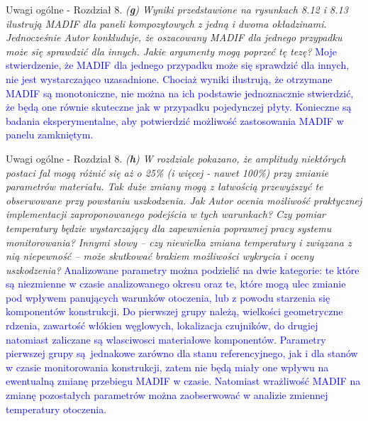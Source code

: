 \documentclass[10pt,aspectratio=169]{beamer} %
\begin{document}
\begin{frame}[label=frame38]{Uwagi ogólne - Rozdział 8.}\justifying
\textit{(\textbf{g}) Wyniki przedstawione na rysunkach 8.12 i 8.13 ilustrują MADIF dla paneli kompozytowych z jedną i dwoma okładzinami. Jednocześnie Autor konkluduje, że oszacowany MADIF dla jednego przypadku może się sprawdzić dla innych. Jakie	argumenty mogą poprzeć tę tezę?} \textcolor{blue}{Moje stwierdzenie, że MADIF dla jednego przypadku może się sprawdzić dla innych, nie jest wystarczająco uzasadnione. Chociaż wyniki ilustrują, że otrzymane MADIF są monotoniczne, nie można na ich podstawie jednoznacznie stwierdzić, że będą one równie skuteczne jak w przypadku pojedynczej płyty. Konieczne są badania eksperymentalne, aby potwierdzić możliwość zastosowania MADIF w panelu zamkniętym.}
\end{frame}
\begin{frame}[label=frame39]{Uwagi ogólne - Rozdział 8.}\justifying
\textit{(\textbf{h}) W rozdziale pokazano, że amplitudy niektórych postaci fal mogą różnić się aż o 25\% (i więcej - nawet 100\%) przy zmianie parametrów materiału. Tak duże zmiany mogą z	łatwością przewyższyć te obserwowane przy powstaniu uszkodzenia. Jak Autor ocenia możliwość praktycznej implementacji zaproponowanego podejścia w tych warunkach?	Czy pomiar temperatury będzie wystarczający dla zapewnienia poprawnej pracy systemu monitorowania? Innymi słowy – czy niewielka zmiana temperatury i związana z nią niepewność – może skutkować brakiem możliwości wykrycia i oceny uszkodzenia?} \textcolor{blue}{Analizowane parametry można podzielić na dwie kategorie: te które są niezmienne w czasie analizowanego okresu oraz te, które mogą ulec zmianie pod wpływem panujących warunków otoczenia, lub z powodu starzenia się komponentów konstrukcji. Do pierwszej grupy należą, wielkości geometryczne rdzenia, zawartość włókien węglowych, lokalizacja czujników, do drugiej natomiast zaliczane są wlasciwosci materiałowe komponentów. Parametry pierwszej grupy są~jednakowe zarówno dla stanu referencyjnego, jak i dla stanów w czasie monitorowania konstrukcji, zatem nie będą miały one wpływu na ewentualną zmianę przebiegu MADIF w czasie. Natomiast wrażliwość MADIF na zmianę pozostałych parametrów można zaobserwować w analizie zmiennej temperatury otoczenia.}
\end{frame}
\end{document}

